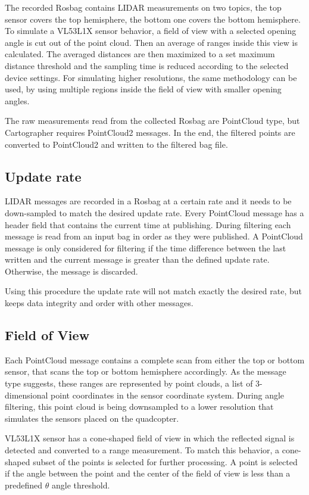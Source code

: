 The recorded Rosbag contains LIDAR measurements on two topics, the top sensor covers the top hemisphere,
the bottom one covers the bottom hemisphere. To simulate a VL53L1X sensor behavior, a field of view with a
selected opening angle is cut out of the point cloud. Then an average of ranges inside this view is calculated.
The averaged distances are then maximized to a set maximum distance threshold and the sampling time is
reduced according to the selected device settings. For simulating higher resolutions, the same methodology
can be used, by using multiple regions inside the field of view with smaller opening angles.

The raw measurements read from the collected Rosbag are PointCloud type, but Cartographer requires
PointCloud2 messages. In the end, the filtered points are converted to PointCloud2 and written
to the filtered bag file.

\subsection{Update rate}
LIDAR messages are recorded in a Rosbag at a certain rate and it needs to be down-sampled to match
the desired update rate. Every PointCloud message has a header field that contains the current time
at publishing. During filtering each message is read from an input bag in order as they were published.
A PointCloud message is only considered for filtering if the time difference between the last written
and the current message is greater than the defined update rate. Otherwise, the message is discarded.

Using this procedure the update rate will not match exactly the desired rate, but keeps data integrity
and order with other messages.



\subsection{Field of View}
Each PointCloud message contains a complete scan from either the top or bottom sensor, that scans the
top or bottom hemisphere accordingly. As the message type suggests, these ranges are represented by
point clouds, a list of 3-dimensional point coordinates in the sensor coordinate system. During
angle filtering, this point cloud is being downsampled to a lower resolution that simulates the sensors
placed on the quadcopter.

VL53L1X sensor has a cone-shaped field of view in which the reflected signal is detected and converted to
a range measurement. To match this behavior, a cone-shaped subset of the points is selected for further
processing. A point is selected if the angle between the point and the center of the field of view is less
than a predefined $\theta$ angle threshold.

